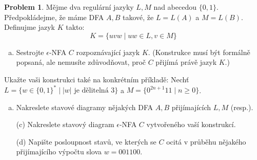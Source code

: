 \documentclass[a4paper,12pt]{article}
\theoremstyle{definition}
\newtheorem{problem}{Problem}
\begin{document}
\begin{problem}

    Mějme dva regulární jazyky $L,M$ nad abecedou $\{0,1\}$. Předpokládejme, že máme DFA $A,B$ takové, že $L=L(A)$ a $M=L(B)$. Definujme jazyk $K$ takto:
    $$K=\{uvw\mid uw\in L, v\in M\}$$
    
    \smallskip
    \begin{enumerate}[(a)]    
        \item Sestrojte $\epsilon$-NFA $C$ rozpoznávající jazyk $K$. 
        (Konstrukce musí být formálně popsaná, ale nemusíte zdůvodňovat, proč $C$ přijímá právě jazyk $K$.)
    \end{enumerate}
    Ukažte vaši konstrukci také na konkrétním příkladě: Nechť $L=\{w\in\{0,1\}^*\mid |w|\text{ je dělitelná 3}\}$ a $M=\{0^{2n+1}11\mid n\geq 0\}$.
    
    \smallskip
    \begin{enumerate}[(b)]
        \item Nakreslete stavové diagramy nějakých DFA $A,B$ přijímajících $L,M$ (resp.). 
        \item[(c)] Nakreslete stavový diagram $\epsilon$-NFA $C$ vytvořeného vaší konstrukcí.  
        \item[(d)] Napište posloupnost stavů, ve kterých se $C$ ocitá v průběhu nějakého přijímajícího výpočtu slova $w=001100$.
    \end{enumerate}

\end{problem}






\end{document}
